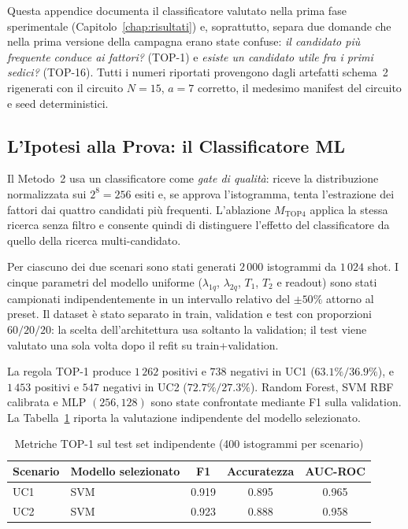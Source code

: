 \begin{onehalfspace}

Questa appendice documenta il classificatore valutato nella prima fase
sperimentale (Capitolo~\ref{chap:risultati}) e, soprattutto, separa due
domande che nella prima versione della campagna erano state confuse:
\emph{il candidato più frequente conduce ai fattori?} (TOP-1) e
\emph{esiste un candidato utile fra i primi sedici?} (TOP-16). Tutti i
numeri riportati provengono dagli artefatti schema~2 rigenerati con il
circuito $N=15$, $a=7$ corretto, il medesimo manifest del circuito e seed
deterministici.

\subsection{L'Ipotesi alla Prova: il Classificatore ML}
\label{sec:risultati_uc_m2}
\label{sec:valutazione_clf}

Il Metodo~2 usa un classificatore come \emph{gate di qualità}: riceve la
distribuzione normalizzata sui $2^8=256$ esiti e, se approva
l'istogramma, tenta l'estrazione dei fattori dai quattro candidati più
frequenti. L'ablazione $M_{\mathrm{TOP4}}$ applica la stessa ricerca senza
filtro e consente quindi di distinguere l'effetto del classificatore da
quello della ricerca multi-candidato.

Per ciascuno dei due scenari sono stati generati $2\,000$ istogrammi da
$1\,024$ shot. I cinque parametri del modello uniforme
($\lambda_{1q}$, $\lambda_{2q}$, $T_1$, $T_2$ e readout) sono stati
campionati indipendentemente in un intervallo relativo del $\pm50\%$
attorno al preset. Il dataset è stato separato in train, validation e
test con proporzioni $60/20/20$: la scelta dell'architettura usa soltanto
la validation; il test viene valutato una sola volta dopo il refit su
train+validation.

La regola TOP-1 produce $1\,262$ positivi e $738$ negativi in UC1
($63.1\%/36.9\%$), e $1\,453$ positivi e $547$ negativi in UC2
($72.7\%/27.3\%$). Random Forest, \ac{SVM} RBF calibrata e \ac{MLP}
$(256,128)$ sono state confrontate mediante F1 sulla validation. La
Tabella~\ref{tab:clf_metrics} riporta la valutazione indipendente del
modello selezionato.

\begin{table}[H]
\centering
\caption{Metriche TOP-1 sul test set indipendente (400 istogrammi per scenario)}
\label{tab:clf_metrics}
\begin{tabular}{llccc}
\toprule
\textbf{Scenario} & \textbf{Modello selezionato} & \textbf{F1} &
\textbf{Accuratezza} & \textbf{\acs{AUC}-ROC} \\
\midrule
UC1 & \ac{SVM} & 0.919 & 0.895 & 0.965 \\
UC2 & \ac{SVM} & 0.923 & 0.888 & 0.958 \\
\bottomrule
\end{tabular}
\end{table}


\end{onehalfspace}
